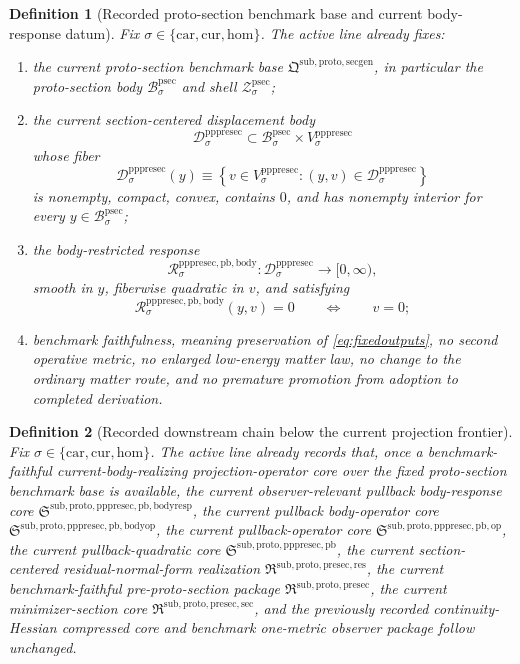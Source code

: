 \documentclass[11pt]{article}
\newcommand{\Car}{\mathrm{car}}
\newcommand{\Cur}{\mathrm{cur}}
\newcommand{\Hom}{\mathrm{hom}}
\newcommand{\ProtoSectionPackage}{\mathfrak Q^{\mathrm{sub,proto,secgen}}}
\newcommand{\ProtoSectionBody}[1]{\mathcal B_{#1}^{\mathrm{psec}}}
\newcommand{\ProtoSectionShell}[1]{\mathcal Z_{#1}^{\mathrm{psec}}}
\newcommand{\PreProtoSectionPackage}{\mathfrak R^{\mathrm{sub,proto,presec}}}
\newcommand{\PreProtoSectionMinSectionCore}{\mathfrak R^{\mathrm{sub,proto,presec,sec}}}
\newcommand{\PreProtoSectionResidualPackage}{\mathfrak R^{\mathrm{sub,proto,presec,res}}}
\newcommand{\PrePreProtoSectionPullbackCore}{\mathfrak S^{\mathrm{sub,proto,pppresec,pb}}}
\newcommand{\PrePreProtoSectionVertical}[1]{V_{#1}^{\mathrm{pppresec}}}
\newcommand{\PrePreProtoSectionResidualBody}[1]{\mathcal D_{#1}^{\mathrm{pppresec}}}
\newcommand{\PrePreProtoSectionBodyResponse}[1]{\mathscr R_{#1}^{\mathrm{pppresec,pb,body}}}
\newcommand{\PullbackOperatorCore}{\mathfrak S^{\mathrm{sub,proto,pppresec,pb,op}}}
\newcommand{\PullbackBodyOperatorCore}{\mathfrak S^{\mathrm{sub,proto,pppresec,pb,bodyop}}}
\newcommand{\PullbackBodyResponseCore}{\mathfrak S^{\mathrm{sub,proto,pppresec,pb,bodyresp}}}
\newtheorem{definition}{Definition}
\begin{document}
\begin{definition}[Recorded proto-section benchmark base and current body-response datum]
\label{def:bodyresp}
Fix \(\sigma\in\{\Car,\Cur,\Hom\}\). The active line already fixes:
\begin{enumerate}
    \item the current proto-section benchmark base \(\ProtoSectionPackage\), in particular the proto-section body \(\ProtoSectionBody{\sigma}\) and shell \(\ProtoSectionShell{\sigma}\);
    \item the current section-centered displacement body
    \[
    \PrePreProtoSectionResidualBody{\sigma}
    \subset
    \ProtoSectionBody{\sigma}\times\PrePreProtoSectionVertical{\sigma}
    \]
    whose fiber
    \[
    \PrePreProtoSectionResidualBody{\sigma}(y)
    \equiv
    \left\{
    v\in\PrePreProtoSectionVertical{\sigma}:(y,v)\in\PrePreProtoSectionResidualBody{\sigma}
    \right\}
    \]
    is nonempty, compact, convex, contains \(0\), and has nonempty interior for every \(y\in\ProtoSectionBody{\sigma}\);
    \item the body-restricted response
    \[
    \PrePreProtoSectionBodyResponse{\sigma}:
    \PrePreProtoSectionResidualBody{\sigma}\to[0,\infty),
    \]
    smooth in \(y\), fiberwise quadratic in \(v\), and satisfying
    \[
    \PrePreProtoSectionBodyResponse{\sigma}(y,v)=0
    \qquad\Longleftrightarrow\qquad
    v=0;
    \]
    \item benchmark faithfulness, meaning preservation of \eqref{eq:fixedoutputs}, no second operative metric, no enlarged low-energy matter law, no change to the ordinary matter route, and no premature promotion from adoption to completed derivation.
\end{enumerate}
\end{definition}

\begin{definition}[Recorded downstream chain below the current projection frontier]
\label{def:downstream}
Fix \(\sigma\in\{\Car,\Cur,\Hom\}\). The active line already records that, once a benchmark-faithful current-body-realizing projection-operator core over the fixed proto-section benchmark base is available, the current observer-relevant pullback body-response core \(\PullbackBodyResponseCore\), the current pullback body-operator core \(\PullbackBodyOperatorCore\), the current pullback-operator core \(\PullbackOperatorCore\), the current pullback-quadratic core \(\PrePreProtoSectionPullbackCore\), the current section-centered residual-normal-form realization \(\PreProtoSectionResidualPackage\), the current benchmark-faithful pre-proto-section package \(\PreProtoSectionPackage\), the current minimizer-section core \(\PreProtoSectionMinSectionCore\), and the previously recorded continuity-Hessian compressed core and benchmark one-metric observer package follow unchanged.
\end{definition}
\end{document}
